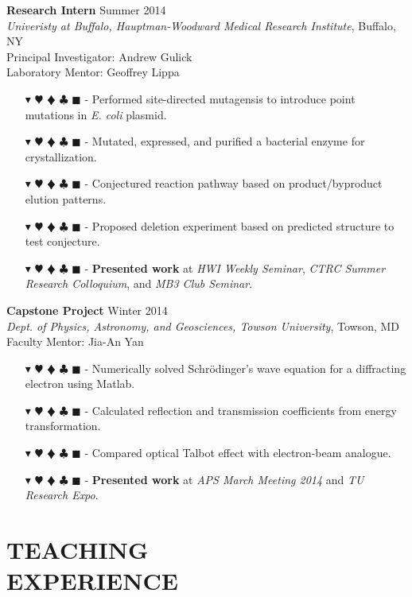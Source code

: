 \documentclass[overlapped, 10pt]{res} %
\newcommand{\physics}{$\blacktriangledown$}
\newcommand{\biochem}{$\varheartsuit$}
\newcommand{\shannon}{$\vardiamondsuit$}
\newcommand{\classic}{$\clubsuit$}
\newcommand{\quantum}{$\blacksquare$}
\newcommand{\physicscolor}{\color{YellowOrange}}
\newcommand{\biochemcolor}{\color{Emerald}}
\newcommand{\shannoncolor}{\color{Goldenrod}}
\newcommand{\classiccolor}{\color{Cyan}}
\newcommand{\quantumcolor}{\color{RedOrange}}
\newcommand{\tag}[1]{
    {\IfSubStr{#1}{\physics}{\physicscolor}{\color{White}}\physics}
    {\IfSubStr{#1}{\biochem}{\biochemcolor}{\color{White}}\biochem}
    {\IfSubStr{#1}{\shannon}{\shannoncolor}{\color{White}}\shannon}
    {\IfSubStr{#1}{\classic}{\classiccolor}{\color{White}}\classic}
    {\IfSubStr{#1}{\quantum}{\quantumcolor}{\color{White}}\quantum}
}
\begin{document}
\begin{resume}
\textbf{Research Intern} \hfill Summer 2014 \\
\textit{Univeristy at Buffalo, Hauptman-Woodward Medical Research Institute}, Buffalo, NY \\
Principal Investigator: Andrew Gulick \\
Laboratory Mentor: Geoffrey Lippa
\begin{itemize} \itemsep -2pt %
\item[\tag{\biochem}-] Performed site-directed mutagensis to introduce point mutations in \textit{E. coli} plasmid.
\item[\tag{\biochem}-] Mutated, expressed, and purified a bacterial enzyme for crystallization.
\item[\tag{\biochem}-] Conjectured reaction pathway based on product/byproduct elution patterns.
\item[\tag{\biochem\classic}-] Proposed deletion experiment based on predicted structure to test conjecture.
\item[\tag{}-] \textbf{Presented work} at \textit{HWI Weekly Seminar}, \textit{CTRC Summer Research Colloquium}, and \textit{MB3 Club Seminar}.
\end{itemize}

\textbf{Capstone Project} \hfill Winter 2014 \\
\textit{Dept. of Physics, Astronomy, and Geosciences, Towson University}, Towson, MD \\
Faculty Mentor: Jia-An Yan
\begin{itemize} \itemsep -2pt %
\item[\tag{\physics\classic}-] Numerically solved Schr\"odinger's wave equation for a diffracting electron using Matlab.
\item[\tag{\physics\classic}-] Calculated reflection and transmission coefficients from energy transformation.
\item[\tag{\physics\classic}-] Compared optical Talbot effect with electron-beam analogue.
\item[\tag{}-] \textbf{Presented work} at \textit{APS March Meeting 2014} and \textit{TU Research Expo}.
\end{itemize}


\section{TEACHING\\EXPERIENCE}


\end{resume}
\end{document}
